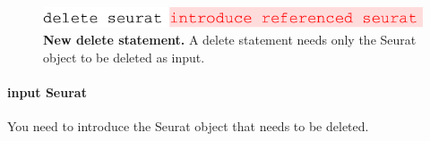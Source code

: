 \begin{figure}
  \centering
    \includegraphics[width=\figWidthTiny]{figures/DeleteSeurat.pdf}
    \caption[New delete statement.]{\textbf{New delete statement.} A delete statement needs only the
    Seurat object to be deleted as input.}
\label{fig:DeleteSeurat}
\end{figure}

\paragraph{input Seurat} You need to introduce the Seurat object that needs to be deleted.
